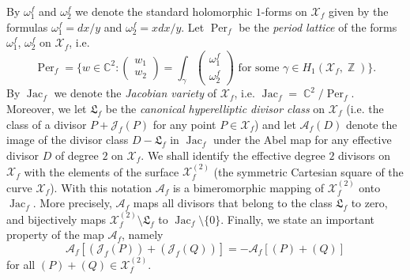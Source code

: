 \documentclass{amsart}
\numberwithin{equation}{section}
\theoremstyle{definition}
\theoremstyle{remark}
\DeclareMathOperator{\Jac}{Jac}
\DeclareMathOperator{\CC}{\mathbb C}
\DeclareMathOperator{\ZZ}{\mathbb Z}
\DeclareMathOperator{\Per}{Per}
\begin{document}
	By $\omega_1^f$ and $\omega_2^f$ we denote the standard holomorphic $1$-forms on $\mathcal X_f$ given by the formulas $\omega_1^f = dx/y$ and $\omega_2^f = xdx/y$. Let $\Per_f$ be the {\it{period lattice}} of the forms $\omega_1^f$, $\omega_2^f$ on $\mathcal X_f$, i.e. 
	\[\Per_f = \{w \in \mathbb C^2: \begin{pmatrix} w_1 \\ w_2 \end{pmatrix} = \int_\gamma \begin{pmatrix} \omega_1^f \\ \omega_2^f \end{pmatrix} \text{ for some } \gamma \in H_1(\mathcal X_f, \ZZ) \}. \]
	By $\Jac_f$ we denote the {\it{Jacobian variety}} of $\mathcal X_f$, i.e. $\Jac_f = \CC^2 / \Per_f$. Moreover, we let $\mathfrak L_f$ be the {\it{canonical hyperelliptic divisor class}} on $\mathcal X_f$ (i.e. the class of a divisor $P + \mathscr J_f(P)$ for any point $P \in \mathcal X_f$) and let $\mathscr A_f(D)$ denote the image of the divisor class $D - \mathfrak L_f$ in $\Jac_f$ under the Abel map for any effective divisor $D$ of degree $2$ on $\mathcal X_f$. We shall identify the effective degree $2$ divisors on $\mathcal X_f$ with the elements of the surface $\mathcal X_f^{(2)}$ (the symmetric Cartesian square of the curve $\mathcal X_f$). With this notation $\mathscr A_f$ is a bimeromorphic mapping of $\mathcal X_f^{(2)}$ onto $\Jac_f$. More precisely, $\mathscr A_f$ maps all divisors that belong to the class $\mathfrak L_f$ to zero, and bijectively maps $\mathcal X_f^{(2)} \setminus \mathfrak L_f$ to $\Jac_ f\setminus \{0\}$. Finally, we state an important property of the map $\mathscr A_f$, namely
	\begin{equation}\label{eqHyperellipticInvolutionAbel}
		\mathscr A_f[(\mathscr J_f(P)) + (\mathscr J_f(Q))] = - \mathscr A_f[(P) + (Q)]
	\end{equation}
	for all $(P) + (Q) \in \mathcal X_f^{(2)}$.
	
\end{document}

